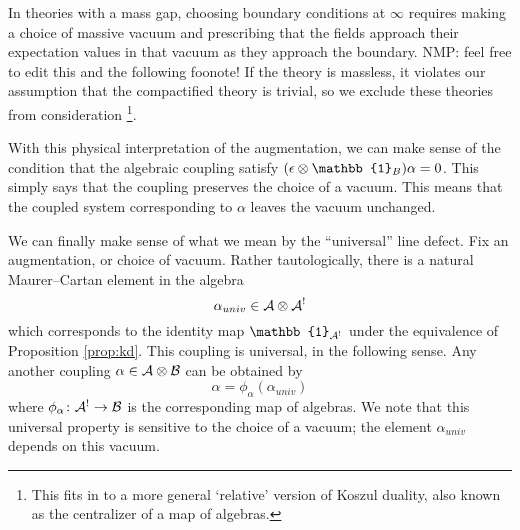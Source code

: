 \documentclass[11pt]{amsart}
\def\id{\mathbb{1}}
\def\brian#1{{\textcolor{blue!65!red}{BRW: {#1}}}}
\def\natalie#1{{\textcolor{green!65!black}{NMP: {#1}}}}
\begin{document}
In theories with a mass gap, choosing boundary conditions at $\infty$ requires making a choice of massive vacuum and prescribing that the fields approach their expectation values in that vacuum as they approach the boundary. \natalie{feel free to edit this and the following foonote!} If the theory is massless, it violates our assumption that the compactified theory is trivial, so we exclude these theories from consideration \footnote{This fits in to a more general `relative' version of Koszul duality, also known as the centralizer of a map of algebras.}.

With this physical interpretation of the augmentation, we can make sense of the condition that the algebraic coupling satisfy $(\ep \otimes \id_B) \alpha = 0$.
This simply says that the coupling preserves the choice of a vacuum.
This means that the coupled system corresponding to $\alpha$ leaves the vacuum unchanged.

We can finally make sense of what we mean by the ``universal'' line defect. 
Fix an augmentation, or choice of vacuum. 
Rather tautologically, there is a natural Maurer--Cartan element in the algebra 
\[
\alpha_{univ} \in \mathcal A \otimes \mathcal A^! 
\]
which corresponds to the identity map $\id_{\cA^!}$ under the equivalence of Proposition \ref{prop:kd}. 
This coupling is universal, in the following sense. 
Any another coupling $\alpha \in \mathcal A \otimes \mathcal B$ can be obtained by
\[
\alpha = \phi_\alpha (\alpha_{univ})
\]
where $\phi_\alpha \colon \mathcal A^! \to \mathcal B$ is the corresponding map of algebras. 
We note that this universal property is sensitive to the choice of a vacuum; the element $\alpha_{univ}$ depends on this vacuum.  

%
%
%
%
%
\end{document}

